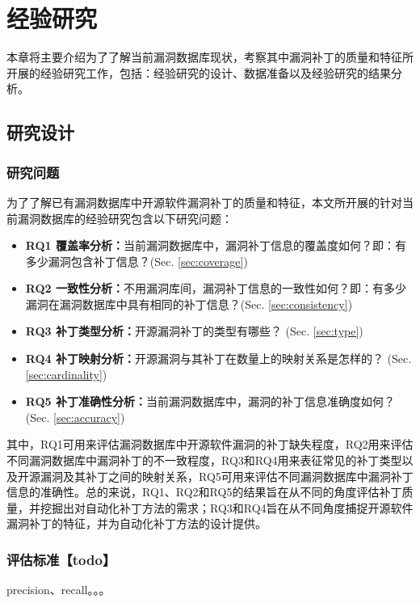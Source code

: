 \chapter{经验研究}\label{sec:study}

本章将主要介绍为了了解当前漏洞数据库现状，考察其中漏洞补丁的质量和特征所开展的经验研究工作，包括：经验研究的设计、数据准备以及经验研究的结果分析。


\section{研究设计}
\subsection{研究问题}
为了了解已有漏洞数据库中开源软件漏洞补丁的质量和特征，本文所开展的针对当前漏洞数据库的经验研究包含以下研究问题：

\begin{itemize}[leftmargin=*]
    \item \textbf{RQ1 覆盖率分析：}当前漏洞数据库中，漏洞补丁信息的覆盖度如何？即：有多少漏洞包含补丁信息？(Sec. \ref{sec:coverage})
    \item \textbf{RQ2 一致性分析：}不用漏洞库间，漏洞补丁信息的一致性如何？即：有多少漏洞在漏洞数据库中具有相同的补丁信息？(Sec. \ref{sec:consistency})
    \item \textbf{RQ3 补丁类型分析：}开源漏洞补丁的类型有哪些？ (Sec. \ref{sec:type})
    \item \textbf{RQ4 补丁映射分析：}开源漏洞与其补丁在数量上的映射关系是怎样的？ (Sec. \ref{sec:cardinality})
    \item \textbf{RQ5 补丁准确性分析：}当前漏洞数据库中，漏洞的补丁信息准确度如何？ (Sec. \ref{sec:accuracy})
\end{itemize}
    
其中，RQ1可用来评估漏洞数据库中开源软件漏洞的补丁缺失程度，RQ2用来评估不同漏洞数据库中漏洞补丁的不一致程度，RQ3和RQ4用来表征常见的补丁类型以及开源漏洞及其补丁之间的映射关系，RQ5可用来评估不同漏洞数据库中漏洞补丁信息的准确性。总的来说，RQ1、RQ2和RQ5的结果旨在从不同的角度评估补丁质量，并挖掘出对自动化补丁方法的需求；RQ3和RQ4旨在从不同角度捕捉开源软件漏洞补丁的特征，并为自动化补丁方法的设计提供。

\subsection{评估标准【todo】}
precision、recall。。。

